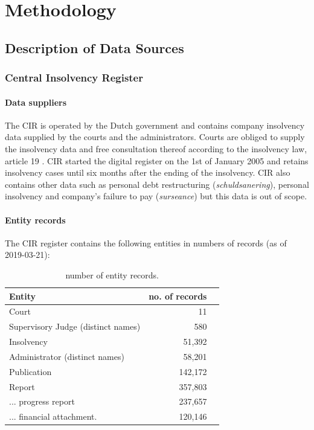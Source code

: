 \section{Methodology}
\subsection{Description of Data Sources}
\subsubsection{Central Insolvency Register}
\paragraph{Data suppliers}
The CIR \cite{rechtspraak:1} is operated by the Dutch government and contains company insolvency data supplied by the courts and the administrators. Courts are obliged to supply the insolvency data and free consultation thereof according to the insolvency law, article 19 \cite{law:1}. CIR started the digital register on the 1st of January 2005 and retains insolvency cases until six months after the ending of the insolvency. CIR also contains other data such as personal debt restructuring (\textit{schuldsanering}), personal insolvency and company's failure to pay (\textit{surseance}) but this data is out of scope.

\paragraph{Entity records}
The CIR register contains the following entities in numbers of records (as of 2019-03-21):

\begin{table}[h]
\caption{number of entity records.}
\centering
\begin{tabular}{l r r}
\hline\hline
Entity & no. of records\\
\hline
Court & 11 \\
Supervisory Judge (distinct names) & 580 \\
Insolvency & 51,392 \\
Administrator (distinct names) & 58,201 \\
Publication & 142,172 \\
Report & 357,803 \\
... progress report & 237,657 \\
... financial attachment. & 120,146 \\
\hline
\end{tabular}
\label{table:cir_contents}
\end{table}

